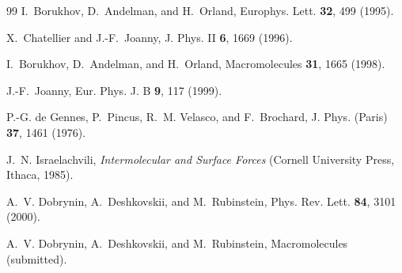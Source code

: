 \documentclass[12pt,a4paper]{article}
\begin{document}
\begin{english}
\begin{thebibliography}{99}
I.~Borukhov, D.~Andelman, and H.~Orland, Europhys. Lett. \textbf{32}, 499 (1995).

X.~Chatellier and J.-F.~Joanny, J. Phys. II \textbf{6}, 1669 (1996).

I.~Borukhov, D.~Andelman, and H.~Orland, Macromolecules \textbf{31}, 1665 (1998).

J.-F.~Joanny, Eur. Phys. J. B \textbf{9}, 117 (1999).

P.-G. de Gennes, P.~Pincus, R.~M. Velasco, and F.~Brochard, J. Phys. (Paris) \textbf{37}, 1461 (1976).

J.~N. Israelachvili, \textit{Intermolecular and Surface Forces} (Cornell University Press, Ithaca, 1985).

A.~V. Dobrynin, A.~Deshkovskii, and M.~Rubinstein, Phys. Rev. Lett. \textbf{84}, 3101 (2000).

A.~V. Dobrynin, A.~Deshkovskii, and M.~Rubinstein, Macromolecules (submitted).


\end{thebibliography}
\end{english}
\end{document}

